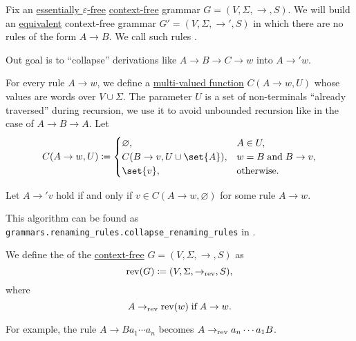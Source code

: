 \begin{algorithm}\label{alg:renaming_rule_collapse}
  Fix an \hyperref[def:epsilon_free_grammar]{essentially \( \varepsilon \)-free} \hyperref[def:chomsky_hierarchy/context_free]{context-free} grammar \( G = (V, \Sigma, \to, S) \). We will build an \hyperref[def:formal_grammar/equivalent]{equivalent} context-free grammar \( G' = (V, \Sigma, \to', S) \) in which there are no rules of the form \( A \to B \). We call such rules .

  Out goal is to \enquote{collapse} derivations like \( A \to B \to C \to w \) into \( A \to' w \).

  \begin{thmenum}
     For every rule \( A \to w \), we define a \hyperref[def:multi_valued_function]{multi-valued function} \( C(A \to w, U) \) whose values are words over \( V \cup \Sigma \). The parameter \( U \) is a set of non-terminals \enquote{already traversed} during recursion, we use it to avoid unbounded recursion like in the case of \( A \to B \to A \). Let
    \begin{equation*}
      C(A \to w, U) \coloneqq \begin{cases}
        \varnothing,                  &A \in U, \\
        C(B \to v, U \cup \set{ A }), &w = B \T{and} B \to v, \\
        \set{ v },                    &\T{otherwise.}
      \end{cases}
    \end{equation*}

     Let \( A \to' v \) hold if and only if \( v \in C(A \to w, \varnothing) \) for some rule \( A \to w \).
  \end{thmenum}
\end{algorithm}
\begin{comments}
  \item This algorithm can be found as \texttt{grammars.renaming\_rules.collapse\_renaming\_rules} in \cite{code}.
\end{comments}

\begin{definition}\label{def:reverse_grammar}
  We define the  of the \hyperref[def:chomsky_hierarchy/context_free]{context-free} \( G = (V, \Sigma, \to, S) \) as
  \begin{equation*}
    \operatorname{rev}(G) \coloneqq (V, \Sigma, \to_{\operatorname{rev}}, S),
  \end{equation*}
  where
  \begin{equation*}
    A \to_{\op{rev}} \op{rev}(w) \T{if} A \to w.
  \end{equation*}
\end{definition}
\begin{comments}
  \item For example, the rule \( A \to Ba_1 \cdots a_n \) becomes \( A \to_{\operatorname{rev}} a_n \cdots a_1 B \).
\end{comments}

